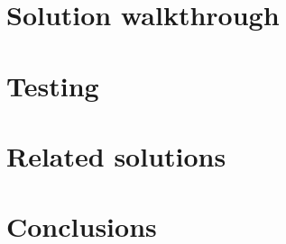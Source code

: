 \documentclass[11pt]{article}
\begin{document}
\section{Solution walkthrough} \label{solution_walkthrough}
\clearpage

\section{Testing} \label{testing}
\clearpage

\section{Related solutions} \label{related_solutions}
\clearpage

\section{Conclusions} \label{conclusions}
\clearpage



\end{document}
